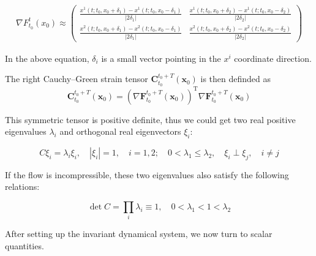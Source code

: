 \begin{footnotesize} 
	\begin{align}
	\nabla F_{t_{0}}^{t}\left(x_{0}\right) \approx\left(\begin{array}{cccc}
	\frac{x^{1}\left(t ; t_{0}, x_{0}+\delta_{1}\right)-x^{1}\left(t ; t_{0}, x_{0}-\delta_{1}\right)}{\left|2 \delta_{1}\right|} & \frac{x^{1}\left(t ; t_{0}, x_{0}+\delta_{2}\right)-x^{1}\left(t ; t_{0}, x_{0}-\delta_{2}\right)}{\left|2 \delta_{2}\right|}  \\
	\frac{x^{2}\left(t ; t_{0}, x_{0}+\delta_{1}\right)-x^{2}\left(t ; t_{0}, x_{0}-\delta_{1}\right)}{\left|2 \delta_{1}\right|} & \frac{x^{2}\left(t ; t_{0}, x_{0}+\delta_{2}\right)-x^{2}\left(t ; t_{0}, x_{0}-\delta_{2}\right)}{\left|2 \delta_{2}\right|}  
	\end{array}\right)
	\label{2-d DF}
	\end{align}
\end{footnotesize}

In the above equation, $ \delta_{i} $ is a small vector pointing in the $ x^{i} $ coordinate direction.

The right Cauchy–Green strain tensor $\mathbf{C}_{t_{0}}^{t_{0}+T}\left(\mathbf{x}_{0}\right)$ is then
definded as 
\begin{equation}
    \mathbf{C}_{t_{0}}^{t_{0}+T}\left(\mathbf{x}_{0}\right)=\left(\nabla \mathbf{F}_{t_{0}}^{t_{0}+T}\left(\mathbf{x}_{0}\right)\right)^{\mathrm{T}} \nabla \mathbf{F}_{t_{0}}^{t_{0}+T}\left(\mathbf{x}_{0}\right)
\end{equation}


This symmetric tensor is positive definite, thus we could get two real positive eigenvalues $ \lambda_{i} $ and orthogonal real eigenvectors $ \xi_{i} $:

\begin{equation}
    C \xi_{i}=\lambda_{i} \xi_{i}, \quad\left|\xi_{i}\right|=1, \quad i=1, 2 ; \quad 0<\lambda_{1} \leq \lambda_{2}, \quad \xi_{i} \perp \xi_{j}, \quad i \neq j
\end{equation}

If the flow is incompressible, these two eigenvalues also satisfy the following relations:
 
\begin{equation}
     \operatorname{det} C=\prod_{i} \lambda_{i} \equiv 1,\quad0<\lambda_{1}<1<\lambda_{2}
\end{equation}



After setting up the invariant dynamical system, we now turn to scalar quantities.

